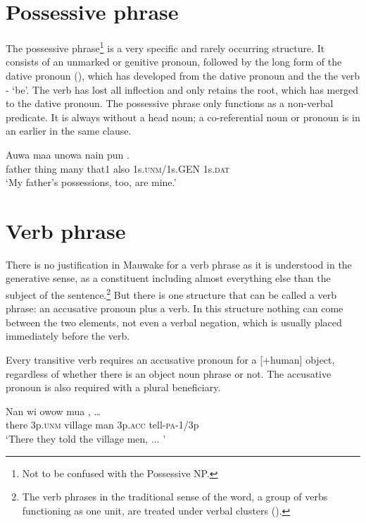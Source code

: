 \section{Possessive phrase}
{}
The possessive phrase\footnote{Not to be confused with the Possessive NP.} is a very specific and rarely occurring structure. It consists of an unmarked or genitive pronoun, followed by the long form of the dative pronoun (), which has developed from the dative pronoun and the the verb - `be'. The verb has lost all inflection and only retains the root, which has merged to the dative pronoun. The possessive phrase only functions as a non-verbal predicate. It is always without a head noun; a co-referential noun or pronoun is in an earlier  in the same clause.

\ea%
\label{ex:x847}
\gll Auwa  maa  unowa  nain  pun   . \\
   father  thing  many  that1  also  1s.\textsc{unm}/1s.GEN  1s.\textsc{dat}   \\
\glt`My father's possessions, too, are mine.'
\z





\section{Verb phrase}
{}
There is no justification in Mauwake for a verb phrase as it is understood in the generative sense, as a constituent including almost everything else than the subject of the sentence.\footnote{The verb phrases in the traditional sense of the word, a group of verbs functioning as one unit, are treated under verbal clusters ().}  But there is one structure that can be called a verb phrase: an accusative pronoun plus a verb.  In this structure nothing can come between the two elements, not even a verbal negation, which is usually placed immediately before the verb.

Every transitive verb requires an accusative pronoun for a [+human] object, regardless of whether there is an object noun phrase or not. The accusative pronoun is also required with a plural beneficiary. 

\ea%
\label{ex:x848}
\gll Nan  wi  owow  mua   ,  {\dots} \\
  there  3p.\textsc{unm}  village  man  3p.\textsc{acc}  tell-\textsc{pa}-1/3p    \\
\glt`There they told the village men, ... '
\z





